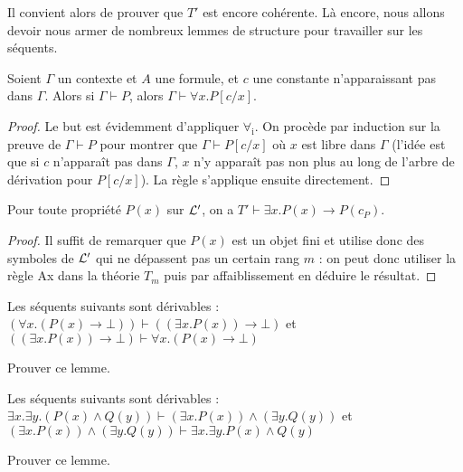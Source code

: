 Il convient alors de prouver que $T'$ est encore cohérente. Là encore, nous allons devoir nous armer de nombreux lemmes de structure pour travailler sur les séquents.

\begin{lem}
    Soient $\Gamma$ un contexte et $A$ une formule, et $c$ une constante n'apparaissant pas dans $\Gamma$. Alors si $\Gamma\vdash P$, alors $\Gamma\vdash \forall x.P[c/x]$.
\end{lem}

\begin{proof}
    Le but est évidemment d'appliquer $\forall_\mathrm i$. On procède par induction sur la preuve de $\Gamma\vdash P$ pour montrer que $\Gamma\vdash P[c/x]$ où $x$ est libre dans $\Gamma$ (l'idée est que si $c$ n'apparaît pas dans $\Gamma$, $x$ n'y apparaît pas non plus au long de l'arbre de dérivation pour $P[c/x]$). La règle s'applique ensuite directement.
\end{proof}

\begin{lem}
    Pour toute propriété $P(x)$ sur $\mathcal L'$, on a $T'\vdash \exists x.P(x)\to P(c_P)$.
\end{lem}

\begin{proof}
    Il suffit de remarquer que $P(x)$ est un objet fini et utilise donc des symboles de $\mathcal L'$ qui ne dépassent pas un certain rang $m$ : on peut donc utiliser la règle Ax dans la théorie $T_m$ puis par affaiblissement en déduire le résultat.
\end{proof}

\begin{lem}\label{lem:distrib}
    Les séquents suivants sont dérivables : $(\forall x. (P(x)\to \bot)) \vdash ((\exists x. P(x))\to \bot)$ et $((\exists x.P(x))\to \bot)\vdash \forall x. (P(x)\to \bot)$
\end{lem}

\begin{exo}
    Prouver ce lemme.
\end{exo}

\begin{lem}\label{lem:distrand}
    Les séquents suivants sont dérivables : $\exists x.\exists y. (P(x)\land Q(y))\vdash (\exists x.P(x))\land (\exists y.Q(y))$ et $(\exists x.P(x))\land (\exists y.Q(y))\vdash \exists x.\exists y. P(x)\land Q(y)$
\end{lem}

\begin{exo}
    Prouver ce lemme.
\end{exo}

